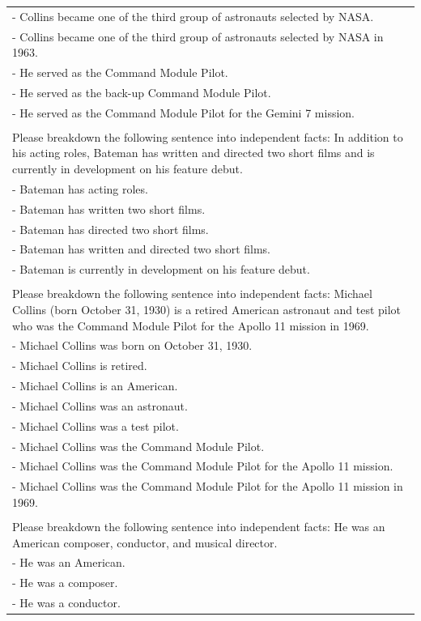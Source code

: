 \documentclass[11pt]{article}
\begin{document}
\begin{table}[t]
\begin{tabular}{|p{}|}
- Collins became one of the third group of astronauts selected by NASA.\\
- Collins became one of the third group of astronauts selected by NASA in 1963.\\
- He served as the Command Module Pilot.\\
- He served as the back-up Command Module Pilot.\\
- He served as the Command Module Pilot for the Gemini 7 mission.\\
\\
Please breakdown the following sentence into independent facts: In addition to his acting roles, Bateman has written and directed two short films and is currently in development on his feature debut.\\
- Bateman has acting roles.\\
- Bateman has written two short films.\\
- Bateman has directed two short films.\\
- Bateman has written and directed two short films.\\
- Bateman is currently in development on his feature debut.\\
\\
Please breakdown the following sentence into independent facts: Michael Collins (born October 31, 1930) is a retired American astronaut and test pilot who was the Command Module Pilot for the Apollo 11 mission in 1969.\\
- Michael Collins was born on October 31, 1930.\\
- Michael Collins is retired.\\
- Michael Collins is an American.\\
- Michael Collins was an astronaut.\\
- Michael Collins was a test pilot.\\
- Michael Collins was the Command Module Pilot.\\
- Michael Collins was the Command Module Pilot for the Apollo 11 mission.\\
- Michael Collins was the Command Module Pilot for the Apollo 11 mission in 1969.\\
\\
Please breakdown the following sentence into independent facts: He was an American composer, conductor, and musical director.\\
- He was an American.\\
- He was a composer.\\
- He was a conductor.\\

\end{tabular}
\end{table}
\end{document}
